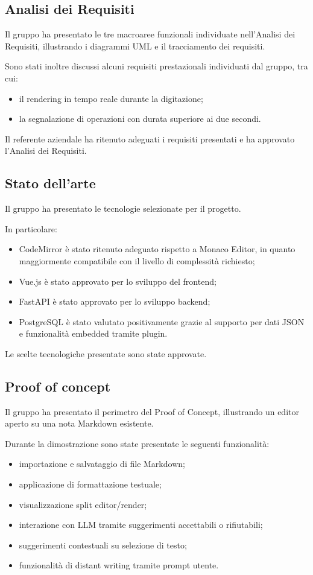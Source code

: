 \subsection{Analisi dei Requisiti}

Il gruppo ha presentato le tre macroaree funzionali individuate
nell’Analisi dei Requisiti, illustrando i diagrammi UML e il
tracciamento dei requisiti.

Sono stati inoltre discussi alcuni requisiti prestazionali
individuati dal gruppo, tra cui:
\begin{itemize}
	\item il rendering in tempo reale durante la digitazione;
	\item la segnalazione di operazioni con durata superiore ai due secondi.
\end{itemize}

Il referente aziendale ha ritenuto adeguati i requisiti presentati
e ha approvato l’Analisi dei Requisiti.

\subsection{Stato dell’arte}
Il gruppo ha presentato le tecnologie selezionate per il progetto.

In particolare:
\begin{itemize}
	\item CodeMirror è stato ritenuto adeguato rispetto a Monaco Editor,
	in quanto maggiormente compatibile con il livello di complessità richiesto;
	\item Vue.js è stato approvato per lo sviluppo del frontend;
	\item FastAPI è stato approvato per lo sviluppo backend;
	\item PostgreSQL è stato valutato positivamente grazie al supporto
	per dati JSON e funzionalità embedded tramite plugin.
\end{itemize}

Le scelte tecnologiche presentate sono state approvate.

\subsection{Proof of concept}

Il gruppo ha presentato il perimetro del Proof of Concept,
illustrando un editor aperto su una nota Markdown esistente.

Durante la dimostrazione sono state presentate le seguenti funzionalità:
\begin{itemize}
	\item importazione e salvataggio di file Markdown;
	\item applicazione di formattazione testuale;
	\item visualizzazione split editor/render;
	\item interazione con LLM tramite suggerimenti accettabili o rifiutabili;
	\item suggerimenti contestuali su selezione di testo;
	\item funzionalità di distant writing tramite prompt utente.
\end{itemize}

